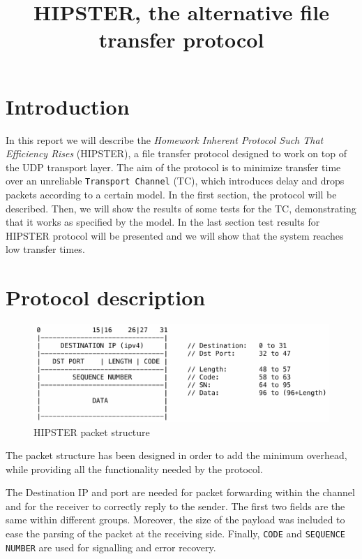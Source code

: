 \documentclass[10pt,twocolumn]{article}
\begin{document}
\title{HIPSTER, the alternative file transfer protocol}
\author{}
\date{}
\maketitle

\section{Introduction}
In this report we will describe the \textit{Homework Inherent Protocol Such That Efficiency Rises} (HIPSTER), a file transfer protocol designed to work on top of the UDP transport layer. The aim of the protocol is to minimize transfer time over an unreliable \texttt{Transport Channel} (TC), which introduces delay and drops packets according to a certain model. In the first section, the protocol will be described. Then, we will show the results of some tests for the TC, demonstrating that it works as specified by the model. In the last section test results for HIPSTER protocol will be presented and we will show that the system reaches low transfer times.

\section{Protocol description}
\begin{figure}[htp]
	\centering
	\includegraphics[width=0.95\columnwidth]{tex/images/packet_structure.pdf}
	\caption{HIPSTER packet structure}
	\label{fig:header}
\end{figure}

The packet structure has been designed in order to add the minimum overhead,
while providing all the functionality needed by the protocol.

The Destination IP and port are needed for packet forwarding within the channel
and for the receiver to correctly reply to the sender. The first two fields are the
same within different groups. Moreover, the size of the payload was included to
ease the parsing of the packet at the receiving side. Finally, \texttt{CODE} and
\texttt{SEQUENCE NUMBER} are used for signalling and error recovery.
\end{document}
